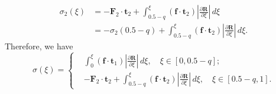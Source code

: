 \documentclass[a4paper,12pt]{report}
\begin{document}
\begin{equation}
	\begin{aligned}
		\label{eqn:97}
		\sigma_2(\xi)&=-\mathbf{F}_2\cdot\mathbf{t}_2+\int_{0.5-q}^\xi (\mathbf{f}\cdot\mathbf{t}_2) \left |\frac{\partial \mathbf{R}}{\partial \xi}\right|\,d\xi\\
		&=-\sigma_2(0.5-q)+\int_{0.5-q}^\xi (\mathbf{f}\cdot\mathbf{t}_2) \left |\frac{\partial \mathbf{R}}{\partial \xi}\right|\,d\xi.
	\end{aligned}
\end{equation}
Therefore, we have 
\begin{equation}
	\sigma(\xi)=\left\{
	\begin{aligned}
		\label{eqn:98}
		&\int_0^\xi (\mathbf{f}\cdot\mathbf{t}_1) \left |\frac{\partial \mathbf{R}}{\partial \xi}\right|\,d\xi,\quad \xi\in[0,0.5-q];\\
		&-\mathbf{F}_2\cdot\mathbf{t}_2+\int_{0.5-q}^\xi (\mathbf{f}\cdot\mathbf{t}_2) \left |\frac{\partial \mathbf{R}}{\partial \xi}\right|\,d\xi, \quad \xi\in[0.5-q,1].
	\end{aligned}\right.
\end{equation}
\end{document}
